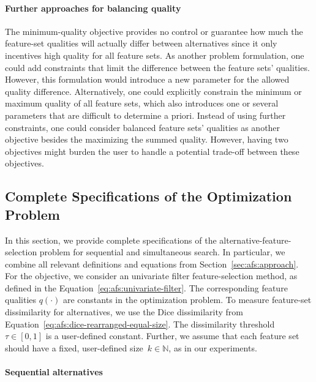 \documentclass{article}
\theoremstyle{definition}
\begin{document}
\paragraph{Further approaches for balancing quality}

The minimum-quality objective provides no control or guarantee how much the feature-set qualities will actually differ between alternatives since it only incentives high quality for all feature sets.
As another problem formulation, one could add constraints that limit the difference between the feature sets' qualities.
However, this formulation would introduce a new parameter for the allowed quality difference.
Alternatively, one could explicitly constrain the minimum or maximum quality of all feature sets, which also introduces one or several parameters that are difficult to determine a priori.
Instead of using further constraints, one could consider balanced feature sets' qualities as another objective besides the maximizing the summed quality.
However, having two objectives might burden the user to handle a potential trade-off between these objectives.

\subsection{Complete Specifications of the Optimization Problem}
\label{sec:afs:appendix:complete-optimization-problem}

In this section, we provide complete specifications of the alternative-feature-selection problem for sequential and simultaneous search.
In particular, we combine all relevant definitions and equations from Section~\ref{sec:afs:approach}.
For the objective, we consider an univariate filter feature-selection method, as defined in the Equation~\ref{eq:afs:univariate-filter}.
The corresponding feature qualities $q(\cdot)$ are constants in the optimization problem.
To measure feature-set dissimilarity for alternatives, we use the Dice dissimilarity from Equation~\ref{eq:afs:dice-rearranged-equal-size}.
The dissimilarity threshold~$\tau \in [0,1]$ is a user-defined constant.
Further, we assume that each feature set should have a fixed, user-defined size~$k \in \mathbb{N}$, as in our experiments.

\paragraph{Sequential alternatives}
\end{document}
